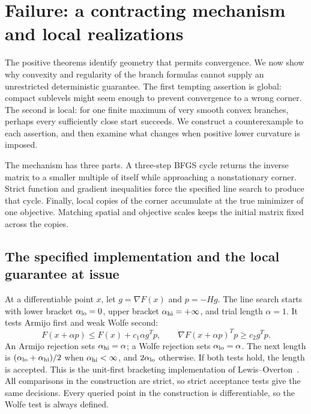 \section{Failure: a contracting mechanism and local realizations}
\label{art:failure}

The positive theorems identify geometry that permits convergence. We now show
why convexity and regularity of the branch formulas cannot supply an
unrestricted deterministic guarantee. The first tempting assertion is
global: compact sublevels might seem enough to prevent convergence to a wrong
corner. The second is local: for one finite maximum of very smooth convex
branches, perhaps every sufficiently close start succeeds. We construct a counterexample to each assertion, and then examine what changes when positive
lower curvature is imposed.

The mechanism has three parts. A three-step BFGS cycle returns the inverse
matrix to a smaller multiple of itself while approaching a nonstationary
corner. Strict function and gradient inequalities force the specified line
search to produce that cycle. Finally, local copies of the corner accumulate
at the true minimizer of one objective. Matching spatial and objective scales
keeps the initial matrix fixed across the copies.

\subsection{The specified implementation and the local guarantee at issue}
At a differentiable point $x$, let $g=\nabla F(x)$ and $p=-Hg$.
The line search starts with lower bracket $\alpha_{\rm lo}=0$, upper bracket
$\alpha_{\rm hi}=+\infty$, and trial length $\alpha=1$. It tests Armijo first and weak
Wolfe second:
\begin{equation}\label{art:failure_tests}
 F(x+\alpha p)\le F(x)+c_1\alpha g^Tp,
 \qquad \nabla F(x+\alpha p)^Tp\ge c_2g^Tp.
\end{equation}
An Armijo rejection sets $\alpha_{\rm hi}=\alpha$; a Wolfe rejection sets $\alpha_{\rm lo}=\alpha$.
The next length is $(\alpha_{\rm lo}+\alpha_{\rm hi})/2$ when $\alpha_{\rm hi}<\infty$, and $2\alpha_{\rm lo}$ otherwise.
If both tests hold, the length is accepted. This is the unit-first
bracketing implementation of Lewis--Overton~\cite[Algorithm~4.6]{LO}.
All comparisons in the construction are strict, so strict acceptance tests
give the same decisions.
Every queried point in the construction is differentiable, so the Wolfe test
is always defined.

